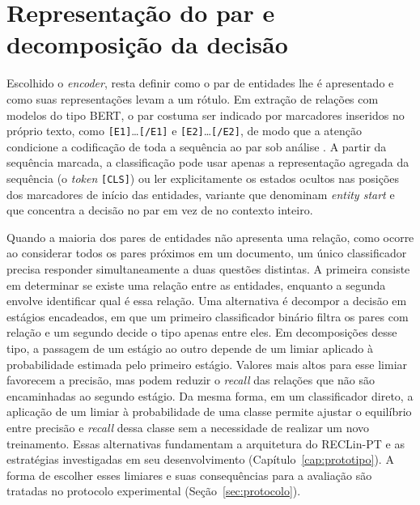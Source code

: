\section{Representação do par e decomposição da decisão}
\label{sec:ref_par}

Escolhido o \emph{encoder}, resta definir como o par de entidades lhe é apresentado e
como suas representações levam a um rótulo. Em extração de relações com modelos do
tipo BERT, o par costuma ser
indicado por marcadores inseridos no próprio texto, como
\texttt{[E1]}\ldots\texttt{[/E1]} e \texttt{[E2]}\ldots\texttt{[/E2]}, de modo
que a atenção condicione a codificação de toda a sequência ao par sob análise
\cite{soares_2019_markers}. A partir da sequência marcada, a classificação pode
usar apenas a representação agregada da sequência (o \emph{token} \texttt{[CLS]})
ou ler explicitamente os estados ocultos nas posições dos marcadores de início das
entidades, variante que  denominam \emph{entity
start} e que concentra a decisão no par em vez de no contexto inteiro.

Quando a maioria dos pares de entidades não apresenta uma relação, como ocorre ao considerar todos os pares próximos em um documento, um único classificador precisa responder simultaneamente a duas questões distintas. A primeira consiste em determinar se existe uma relação entre as entidades, enquanto a segunda envolve identificar qual é essa relação. Uma alternativa é decompor a decisão em estágios encadeados,
em que um primeiro classificador binário filtra os pares com relação e um segundo
decide o tipo apenas entre eles. Em decomposições desse tipo, a passagem de um estágio ao outro depende de um limiar aplicado à probabilidade estimada pelo primeiro estágio. Valores mais altos para esse limiar favorecem a precisão, mas podem reduzir o \emph{recall} das relações que não são encaminhadas ao segundo estágio. Da mesma forma, em um classificador direto, a aplicação de um limiar à probabilidade de uma classe permite ajustar o equilíbrio entre precisão e \emph{recall} dessa classe sem a necessidade de realizar um novo treinamento. Essas
alternativas fundamentam a arquitetura do RECLin-PT e as estratégias investigadas em
seu desenvolvimento (Capítulo~\ref{cap:prototipo}). A forma de escolher esses
limiares e suas consequências para a avaliação são tratadas no protocolo experimental
(Seção~\ref{sec:protocolo}).
